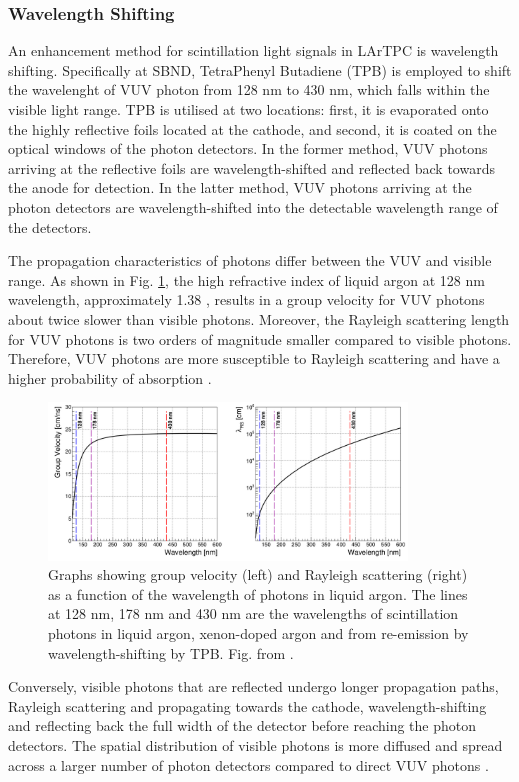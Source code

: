 \subsubsection{Wavelength Shifting}
\label{sec:wls}

An enhancement method for scintillation light signals in LArTPC is wavelength shifting.
Specifically at SBND, TetraPhenyl Butadiene (TPB) is employed to shift the wavelenght of VUV photon from 128 nm to 430 nm, which falls within the visible light range.
TPB is utilised at two locations: first, it is evaporated onto the highly reflective foils located at the cathode, and second, it is coated on the optical windows of the photon detectors. 
In the former method, VUV photons arriving at the reflective foils are wavelength-shifted and reflected back towards the anode for detection.
In the latter method,  VUV photons arriving at the photon detectors are wavelength-shifted into the detectable wavelength range of the detectors.

The propagation characteristics of photons differ between the VUV and visible range.
As shown in Fig. \ref{fig:vuv_visible}, the high refractive index of liquid argon at 128 nm wavelength, approximately 1.38 \cite{lar_index}, results in a group velocity for VUV photons about twice slower than visible photons.
Moreover, the Rayleigh scattering length for VUV photons is two orders of magnitude smaller compared to visible photons.
Therefore, VUV photons are more susceptible to Rayleigh scattering and have a higher probability of absorption \cite{PatrickPhD}.
\begin{figure}[htp] 
\centering    
\includegraphics[width=0.85\textwidth]{vuv_visible}
\caption[vuv_visible]{
Graphs showing group velocity (left) and Rayleigh scattering (right) as a function of the wavelength of photons in liquid argon.
The lines at 128 nm, 178 nm and 430 nm are the wavelengths of scintillation photons in liquid argon, xenon-doped argon and from re-emission by wavelength-shifting by TPB. 
Fig. from \cite{PatrickPhD}.
}
\label{fig:vuv_visible}
\end{figure}
Conversely, visible photons that are reflected undergo longer propagation paths, Rayleigh scattering and propagating towards the cathode, wavelength-shifting and reflecting back the full width of the detector before reaching the photon detectors.
The spatial distribution of visible photons is more diffused and spread across a larger number of photon detectors compared to direct VUV photons \cite{PatrickPhD}.

